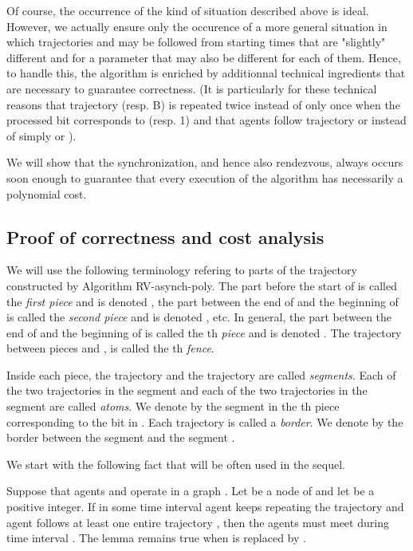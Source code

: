 \documentclass [11pt] {article}
\begin{document}
{Of course, the occurrence of the kind of situation described above is ideal. However, we actually ensure only the occurence of a more general situation in which trajectories  and  may be followed from starting times that are "slightly" different and for a parameter  that may also be different for each of them. Hence, to handle this, the algorithm is enriched by additionnal technical ingredients that are necessary to guarantee correctness. (It is particularly for these technical reasons that trajectory  (resp. B) is repeated twice instead of only once when the processed bit corresponds to  (resp. 1) and that agents follow trajectory  or  instead of simply  or ).}


{We will show that the synchronization, and hence also rendezvous, always occurs soon enough to guarantee that every execution of the algorithm has necessarily a polynomial cost.}


\subsection{Proof of correctness and cost analysis}

We will use the following terminology refering to parts of the trajectory constructed by Algorithm RV-asynch-poly. The part before the start of  is called the {\em first piece}
and is denoted ,
the part between the end of  and the beginning of  is called the {\em second piece} and is denoted , etc. In general, the part  
 between the end of  and the beginning of  is called the th {\em  piece} and is denoted .
 The trajectory  between pieces  and , is called the th {\em fence}.
 
 Inside each piece, the trajectory  and the trajectory   are called {\em segments}. Each of the two trajectories  in the segment  and each of the two trajectories   in the segment   are called {\em atoms}. We denote by  the segment in the th piece corresponding to the bit  in .  Each trajectory
  is called a {\em border}. We denote by  the border between the segment  and the segment .
 
 We start with the following fact that will be often used in the sequel.
 
 \begin{lemma}\label{tunel}
 Suppose that agents  and  operate in a graph . Let  be a node of  and let  be a positive integer. If in some time interval  agent  keeps repeating the trajectory  and agent  follows at least one entire trajectory , then the agents must meet during time interval .
 The lemma remains true when  is replaced by .
 \end{lemma}
 
\end{document}
